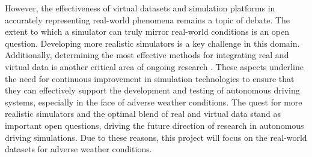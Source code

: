 \documentclass[report.tex]{subfiles}
\begin{document}
    However, the effectiveness of virtual datasets and simulation platforms in accurately representing real-world phenomena remains a topic of debate. The extent to which a simulator can truly mirror real-world conditions is an open question. Developing more realistic simulators is a key challenge in this domain. Additionally, determining the most effective methods for integrating real and virtual data is another critical area of ongoing research \cite{feng2020deep}. These aspects underline the need for continuous improvement in simulation technologies to ensure that they can effectively support the development and testing of autonomous driving systems, especially in the face of adverse weather conditions. The quest for more realistic simulators and the optimal blend of real and virtual data stand as important open questions, driving the future direction of research in autonomous driving simulations. Due to these reasons, this project will focus on the real-world datasets for adverse weather conditions.
\end{document}
